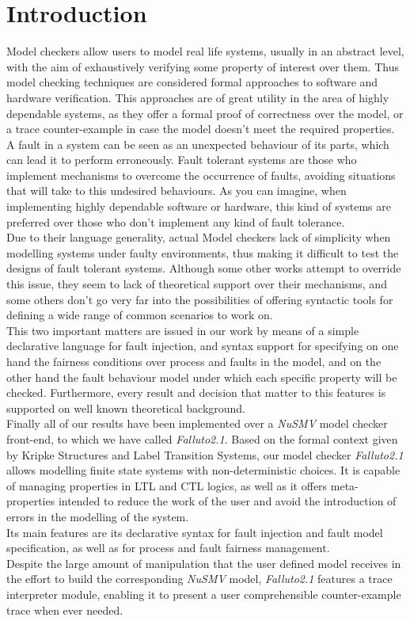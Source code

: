 \documentclass[12pt]{article}
\begin{document}
\section{Introduction}
Model checkers allow users to model real life systems, usually in an abstract level,
with the aim of exhaustively verifying some property of interest over them. Thus model checking techniques are considered formal approaches to software and hardware verification. This approaches are of great utility in the area of highly dependable systems, as they offer a formal proof of correctness over the model, or a trace counter-example in case the model doesn't meet the required properties.\\
A fault in a system can be seen as an unexpected behaviour of its parts, which can lead it to perform erroneously. Fault tolerant systems are those who implement mechanisms to overcome the occurrence of faults, avoiding situations that will take to this undesired behaviours. As you can imagine, when implementing highly dependable software or hardware, this kind of systems are preferred over those who don't implement any kind of fault tolerance.\\
Due to their language generality, actual Model checkers lack of simplicity when modelling systems under
faulty environments, thus making it difficult to test the designs of fault tolerant systems. Although some other
works attempt to override this issue, they seem to lack of theoretical support
over their mechanisms, and some others don't go very far into the possibilities
of offering syntactic tools for defining a wide range of common scenarios to
work on.\\
This two important matters are issued in our work by means of a simple
declarative language for fault injection, and syntax support for specifying
on one hand the fairness conditions over process and faults in the model, and 
on the other hand the fault behaviour model under which each specific property
will be checked. Furthermore, every result and decision that matter to this
features is supported on well known theoretical background.\\
Finally all of our results have been implemented over a \mbox{\textit{NuSMV}}\cite{NuSMV} model checker front-end, to which we have called \mbox{\textit{Falluto2.1}}.
Based on the formal context given by Kripke Structures and Label Transition 
Systems, our model checker \mbox{\textit{Falluto2.1}} allows modelling finite state systems with
non-deterministic choices. It is capable of managing properties in LTL and CTL
logics, as well as it offers meta-properties intended to reduce the work of the
user and avoid the introduction of errors in the modelling of the system.\\
Its main features are its declarative syntax for fault injection and fault
model specification, as well as for process and fault fairness management.\\
Despite the large amount of manipulation that the user defined model receives
in the effort to build the corresponding \mbox{\textit{NuSMV}} model,
\mbox{\textit{Falluto2.1}} features a trace interpreter module, enabling it
to present a user comprehensible counter-example trace when ever needed.
\end{document}
